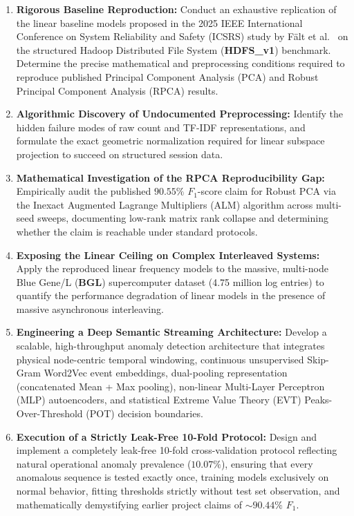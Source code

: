 \begin{enumerate}
    \item \textbf{Rigorous Baseline Reproduction:} Conduct an exhaustive replication of the linear baseline models proposed in the 2025 IEEE International Conference on System Reliability and Safety (ICSRS) study by F{\"a}lt et al.~\cite{falt2025lightweight} on the structured Hadoop Distributed File System (\textbf{HDFS\_v1}) benchmark. Determine the precise mathematical and preprocessing conditions required to reproduce published Principal Component Analysis (PCA) and Robust Principal Component Analysis (RPCA) results.
    \item \textbf{Algorithmic Discovery of Undocumented Preprocessing:} Identify the hidden failure modes of raw count and TF-IDF representations, and formulate the exact geometric normalization required for linear subspace projection to succeed on structured session data.
    \item \textbf{Mathematical Investigation of the RPCA Reproducibility Gap:} Empirically audit the published $90.55\%$ $F_1$-score claim for Robust PCA via the Inexact Augmented Lagrange Multipliers (ALM) algorithm across multi-seed sweeps, documenting low-rank matrix rank collapse and determining whether the claim is reachable under standard protocols.
    \item \textbf{Exposing the Linear Ceiling on Complex Interleaved Systems:} Apply the reproduced linear frequency models to the massive, multi-node Blue Gene/L (\textbf{BGL}) supercomputer dataset (4.75 million log entries) to quantify the performance degradation of linear models in the presence of massive asynchronous interleaving.
    \item \textbf{Engineering a Deep Semantic Streaming Architecture:} Develop a scalable, high-throughput anomaly detection architecture that integrates physical node-centric temporal windowing, continuous unsupervised Skip-Gram Word2Vec event embeddings, dual-pooling representation (concatenated Mean + Max pooling), non-linear Multi-Layer Perceptron (MLP) autoencoders, and statistical Extreme Value Theory (EVT) Peaks-Over-Threshold (POT) decision boundaries.
    \item \textbf{Execution of a Strictly Leak-Free 10-Fold Protocol:} Design and implement a completely leak-free 10-fold cross-validation protocol reflecting natural operational anomaly prevalence ($10.07\%$), ensuring that every anomalous sequence is tested exactly once, training models exclusively on normal behavior, fitting thresholds strictly without test set observation, and mathematically demystifying earlier project claims of $\sim 90.44\%$ $F_1$.

\end{enumerate}

